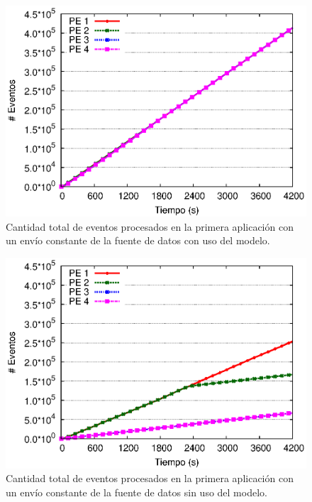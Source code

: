 \begin{figure}[!ht]
	\centering
    \includegraphics[scale=0.7]{images/exp/app1/uniform/cm/eventCount.eps}
    \caption{Cantidad total de eventos procesados en la primera aplicación con un envío constante de la fuente de datos con uso del modelo.}
    \label{fig:app1-uniform-eventCount-cm}
\end{figure}

\begin{figure}[!ht]
	\centering
    \includegraphics[scale=0.7]{images/exp/app1/uniform/sm/eventCount.eps}
    \caption{Cantidad total de eventos procesados en la primera aplicación con un envío constante de la fuente de datos sin uso del modelo.}
    \label{fig:app1-uniform-eventCount-sm}
\end{figure}

